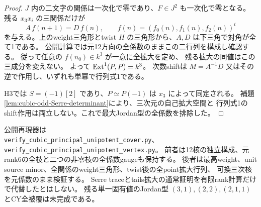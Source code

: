 \begin{proof}
$J$ 内の二文字の関係は一次化で零であり、$F\in J^2$ も一次化で零となる。
残る $x_3x_i$ の三関係だけが
\[
 A\,f(n+1)=D\,f(n),\qquad f(n)=(f_0(n),f_1(n),f_2(n))^t
\]
を与える。上のweight三角形とtwist $H$ の三角形から、$A,D$ は下三角で対角が全て1である。
公開計算では元12方向の全係数のままこの二行列を構成し確認する。
従って任意の $f(n_0)\in k^3$ が一意に全拡大を定め、
残る拡大の同値はこの三成分を変えない。
よって $\operatorname{Ext}^1(P,P)=k^3$。
次数shiftは $M=A^{-1}D$ 又はその逆で作用し、いずれも単冪で行列式1である。

H3では $S=(-1)[2]$ であり、$P\simeq P(-1)$ は $x_3$ によって同定される。
補題\ref{lem:cubic-odd-Serre-determinant}により、三次元の自己拡大空間と
行列式1のshift作用は両立しない。これで最大Jordan型の全係数を排除した。
\end{proof}

公開再現器は\\
\texttt{verify\_cubic\_principal\_unipotent\_cover.py}、\\
\texttt{verify\_cubic\_principal\_unipotent\_vertex.py}。
前者は12核の独立構成、元rank6の全枝と二つの非零枝の全係数gaugeも保持する。
後者は最高weight、unit source minor、全関係のweight三角形、twist後の全point拡大行列、
可換三次核を元係数のまま検証する。
Serre traceとtails拡大の通常証明を有限rank計算だけで代替したとはしない。
残る単一固有値のJordan型 $(3,1),(2,2),(2,1,1)$ とCY全被覆は未完成である。
